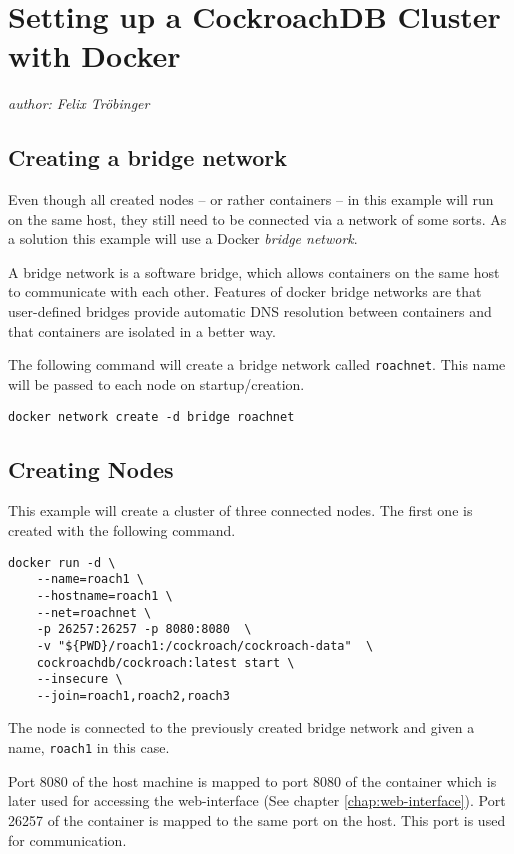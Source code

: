\section{Setting up a CockroachDB Cluster with Docker}\label{chap:how-to}
\emph{author: Felix Tröbinger}\bigskip

\subsection{Creating a bridge network}
Even though all created nodes -- or rather containers -- in this example will run on the same host, they still need to be connected via a network of some sorts. As a solution this example will use a Docker \emph{bridge network}.

A bridge network is a software bridge, which allows containers on the same host to communicate with each other. Features of docker bridge networks are that user-defined bridges provide automatic DNS resolution between containers and that containers are isolated in a better way.\cite{docker-bridge}

\medskip
The following command will create a bridge network called \verb|roachnet|. This name will be passed to each node on startup/creation.

\begin{verbatim}
docker network create -d bridge roachnet
\end{verbatim}

\subsection{Creating Nodes}\label{chap:creating-nodes}

This example will create a cluster of three connected nodes. The first one is created with the following command.

\begin{verbatim}
docker run -d \
    --name=roach1 \
    --hostname=roach1 \
    --net=roachnet \
    -p 26257:26257 -p 8080:8080  \
    -v "${PWD}/roach1:/cockroach/cockroach-data"  \
    cockroachdb/cockroach:latest start \
    --insecure \
    --join=roach1,roach2,roach3
\end{verbatim}

The node is connected to the previously created bridge network and given a name, \verb|roach1| in this case.

\medskip
Port 8080 of the host machine is mapped to port 8080 of the container which is later used for accessing the web-interface (See chapter \ref{chap:web-interface}).
Port 26257 of the container is mapped to the same port on the host. This port is used for communication.

